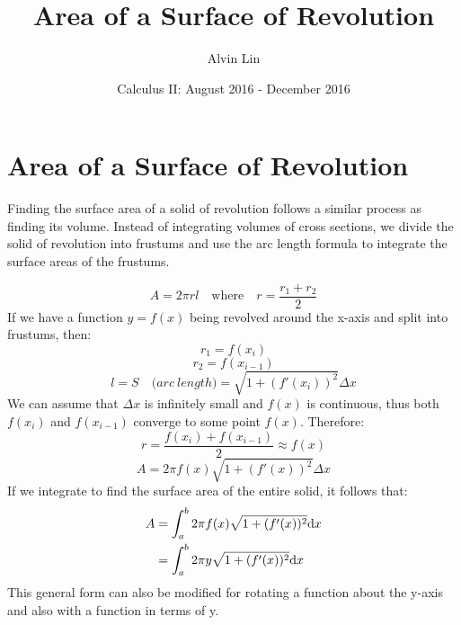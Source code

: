 \documentclass[letterpaper, 12pt]{math}
\title{Area of a Surface of Revolution}
\author{Alvin Lin}
\date{Calculus II: August 2016 - December 2016}
\begin{document}
\maketitle

\section*{Area of a Surface of Revolution}
Finding the surface area of a solid of revolution follows a similar process as
finding its volume. Instead of integrating volumes of cross sections, we divide
the solid of revolution into frustums and use the arc length formula to
integrate the surface areas of the frustums.
\begin{center}
\end{center}
\[ A = 2\pi r l \quad \mathrm{where} \quad r = \frac{r_{1}+r_{2}}{2} \]
If we have a function \( y=f(x) \) being revolved around the x-axis and split
into frustums, then:
\[ r_{1} = f(x_{i}) \]
\[ r_{2} = f(x_{i-1}) \]
\[ l = S \quad \mathrm(arc\ length) = \sqrt{1+(f'(x_{i}))^{2}}\Delta x \]
We can assume that \( \Delta x \) is infinitely small and \( f(x) \) is
continuous, thus both \( f(x_{i}) \) and \( f(x_{i-1}) \) converge to some
point \( f(x) \). Therefore:
\[ r = \frac{f(x_{i})+f(x_{i-1})}{2} \approx f(x) \]
\[ A = 2\pi f(x)\sqrt{1+(f'(x))^{2}}\Delta x \]
If we integrate to find the surface area of the entire solid, it follows that:
\begin{align*}
  A &= \int_{a}^{b}{2\pi f(x)\sqrt{1+(f'(x))^{2}}\mathrm{d}{x}} \\
  &= \int_{a}^{b}{2\pi y\sqrt{1+(f'(x))^{2}}\mathrm{d}{x}}
\end{align*}
This general form can also be modified for rotating a function about the y-axis
and also with a function in terms of y.
\end{document}
